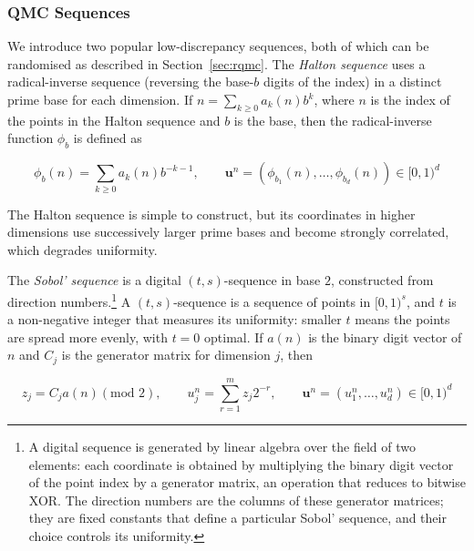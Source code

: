 

\subsubsection{QMC Sequences}
\label{sec:qmc-sequences}

We introduce two popular low-discrepancy sequences, both of which can be randomised as described in Section~\ref{sec:rqmc}. The \emph{Halton sequence} \citep{halton1960quasirandom} uses a radical-inverse sequence (reversing the base-$b$ digits of the index) in a distinct prime base for each dimension. If $n = \sum_{k\geq 0} a_k (n) b^k$, where $n$ is the index of the points in the Halton sequence and $b$ is the base, then the radical-inverse function $\phi_b$ is defined as

\begin{equation*}
    \phi_b(n) = \sum_{k\geq 0} a_k (n) b^{-k-1}, \qquad \mathbf{u}^n = (\phi_{b_1}(n), \ldots, \phi_{b_d}(n)) \in [0,1)^d
\end{equation*}

The Halton sequence is simple to construct, but its coordinates in higher dimensions use successively larger prime bases and become strongly correlated, which degrades uniformity.

The \emph{Sobol' sequence} \citep{sobol1967distribution} is a digital $(t,s)$-sequence in base $2$, constructed from direction numbers.\footnote{A digital sequence is generated by linear algebra over the field of two elements: each coordinate is obtained by multiplying the binary digit vector of the point index by a generator matrix, an operation that reduces to bitwise XOR. The direction numbers are the columns of these generator matrices; they are fixed constants that define a particular Sobol' sequence, and their choice controls its uniformity.} A $(t,s)$-sequence is a sequence of points in $[0,1)^s$, and $t$ is a non-negative integer that measures its uniformity: smaller $t$ means the points are spread more evenly, with $t=0$ optimal. If $a(n)$ is the binary digit vector of $n$ and $C_j$ is the generator matrix for dimension $j$, then

\begin{equation*}
    z_j = C_j a(n) (\text{mod } 2), \qquad u_j^n = \sum_{r = 1}^{m} z_j 2^{-r}, \qquad \mathbf{u}^n = (u_1^n, \ldots, u_d^n) \in [0,1)^d
\end{equation*}

